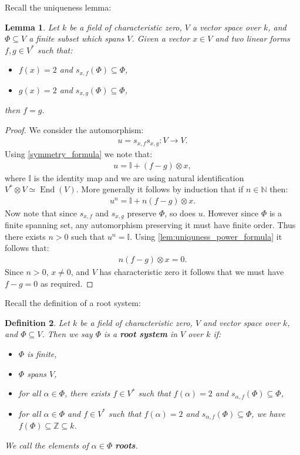 \documentclass[12pt, a4paper]{article}
\newtheorem{lemma}{Lemma}[section]
\newtheorem{definition}[lemma]{Definition}
\DeclareMathOperator{\End}{{End}}
\begin{document}
Recall the uniqueness lemma:
\begin{lemma}\label{lem:uniqueness}
  Let $k$ be a field of characteristic zero, $V$ a vector space over $k$, and $\Phi \subseteq V$
  a finite subset which spans $V$. Given a vector $x \in V$ and two linear forms $f, g \in V^*$
  such that:
  \begin{itemize}
    \item $f(x) = 2$ and $s_{x, f}(\Phi) \subseteq \Phi$,
    \item $g(x) = 2$ and $s_{x, g}(\Phi) \subseteq \Phi$,
  \end{itemize}
  then $f = g$.
\end{lemma}
\begin{proof}
  We consider the automorphism:
  \begin{align*}
    u = s_{x, f} s_{x, g} : V \to V.
  \end{align*}
  Using \eqref{symmetry_formula} we note that:
  \begin{align*}
    u = \mathbb{I} + (f - g) \otimes x,
  \end{align*}
  where $\mathbb{I}$ is the identity map and we are using natural identification
  $V^* \otimes V \simeq \End(V)$.
  More generally it follows by induction that if $n \in \mathbb{N}$ then:
  \begin{align}\label{lem:uniquness_power_formula}
    u^n = \mathbb{I} + n (f - g) \otimes x.
  \end{align}
  Now note that since $s_{x, f}$ and $s_{x, g}$ preserve $\Phi$, so does $u$. However since $\Phi$
  is a finite spanning set, any automorphism preserving it must have finite order. Thus there
  exists $n > 0$ such that $u^n = \mathbb{I}$. Using \eqref{lem:uniquness_power_formula} it
  follows that:
  \begin{align*}
    n (f - g) \otimes x = 0.
  \end{align*}
  Since $n > 0$, $x \ne 0$, and $V$ has characteristic zero it follows that we must have
  $f - g = 0$ as required.
\end{proof}

Recall the definition of a root system:
\begin{definition}
  Let $k$ be a field of characteristic zero, $V$ and vector space over $k$, and
  $\Phi \subseteq V$. Then we say $\Phi$ is a \textbf{root system} in $V$ over $k$ if:
  \begin{itemize}
    \item $\Phi$ is finite,
    \item $\Phi$ spans $V$,
    \item for all $\alpha \in \Phi$, there exists $f \in V^*$ such that $f(\alpha) = 2$ and
    $s_{\alpha, f}(\Phi) \subseteq \Phi$,
    \item for all $\alpha \in \Phi$ and $f \in V^*$ such that $f(\alpha) = 2$ and
    $s_{\alpha, f}(\Phi) \subseteq \Phi$, we have $f(\Phi) \subseteq \mathbb{Z} \subseteq k$.
  \end{itemize}
  We call the elements of $\alpha \in \Phi$ \textbf{roots}.
\end{definition}
\end{document}
